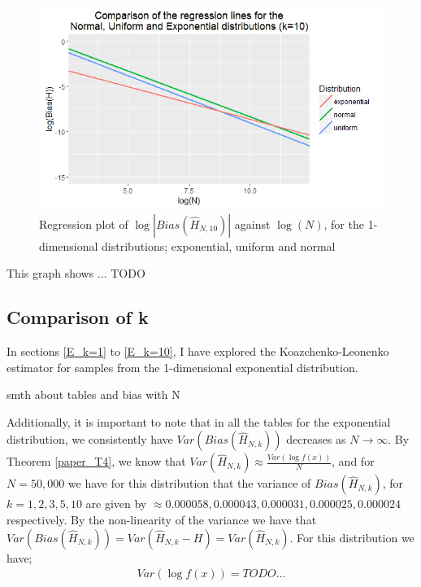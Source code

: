 \documentclass{report}
\begin{document}
\begin{figure}
  \begin{center}
    \includegraphics[width=\textwidth]{./Graphs/EUN_k=10_plot.png}
  \end{center}
\caption{Regression plot of $\log|Bias(\hat{H}_{N, 10})|$ against $\log(N)$, for the 1-dimensional distributions; exponential, uniform and normal}
  \label{E_U_N_k=10_graph}
\end{figure}

This graph shows ... TODO 





\subsection{Comparison of k} \label{E_compare_k}

In sections \ref{E_k=1} to \ref{E_k=10}, I have explored the Koazchenko-Leonenko estimator for samples from the 1-dimensional exponential distribution. 

smth about tables and bias with N

Additionally, it is important to note that in all the tables for the exponential distribution, we consistently have $Var(Bias(\hat{H}_{N, k}))$ decreases as $N \to \infty$. By Theorem \ref{paper_T4}, we know that $Var(\hat{H}_{N, k}) \approx \frac{Var(\log f(x))}{N}$, and for $N=50,000$ we have for this distribution that the variance of $Bias(\hat{H}_{N, k})$, for $k=1,2,3,5,10$ are given by $\approx 0.000058, 0.000043, 0.000031, 0.000025, 0.000024$ respectively. By the non-linearity of the variance we have that  $Var(Bias(\hat{H}_{N, k})) = Var(\hat{H}_{N,k} - H) = Var(\hat{H}_{N,k})$. For this distribution we have;
\begin{align}
Var(\log f(x)) = TODO... 
\end{align}
\end{document}
